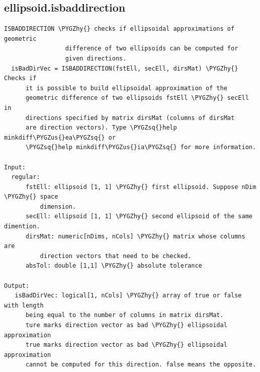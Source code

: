 \documentclass[letterpaper,10pt,english]{sphinxmanual}
\def\PYGZus{\char`\_}
\def\PYGZhy{\char`\-}
\def\PYGZsq{\char`\'}
\begin{document}
\subsection{ellipsoid.isbaddirection}
\label{chap_functions:ellipsoid-isbaddirection}
\begin{Verbatim}[commandchars=\\\{\}]
ISBADDIRECTION \PYGZhy{} checks if ellipsoidal approximations of geometric
                 difference of two ellipsoids can be computed for
                 given directions.
  isBadDirVec = ISBADDIRECTION(fstEll, secEll, dirsMat) \PYGZhy{} Checks if
      it is possible to build ellipsoidal approximation of the
      geometric difference of two ellipsoids fstEll \PYGZhy{} secEll in
      directions specified by matrix dirsMat (columns of dirsMat
      are direction vectors). Type \PYGZsq{}help minkdiff\PYGZus{}ea\PYGZsq{} or
      \PYGZsq{}help minkdiff\PYGZus{}ia\PYGZsq{} for more information.

Input:
  regular:
      fstEll: ellipsoid [1, 1] \PYGZhy{} first ellipsoid. Suppose nDim \PYGZhy{} space
          dimension.
      secEll: ellipsoid [1, 1] \PYGZhy{} second ellipsoid of the same dimention.
      dirsMat: numeric[nDims, nCols] \PYGZhy{} matrix whose columns are
          direction vectors that need to be checked.
      absTol: double [1,1] \PYGZhy{} absolute tolerance

Output:
   isBadDirVec: logical[1, nCols] \PYGZhy{} array of true or false with length
      being equal to the number of columns in matrix dirsMat.
      ture marks direction vector as bad \PYGZhy{} ellipsoidal approximation
      true marks direction vector as bad \PYGZhy{} ellipsoidal approximation
      cannot be computed for this direction. false means the opposite.
\end{Verbatim}
\end{document}
